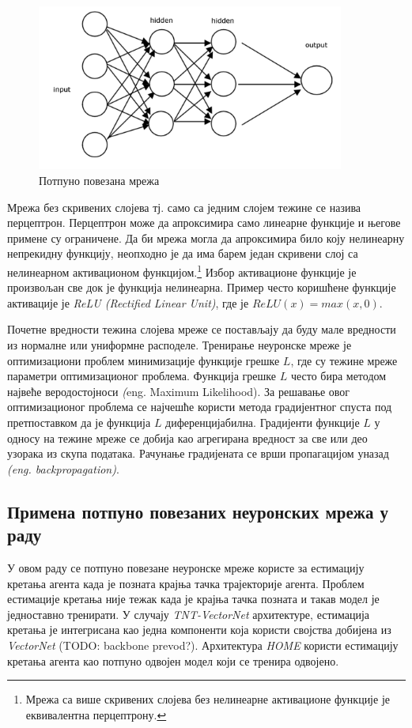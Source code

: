 \documentclass[11pt,oneside]{memoir}
\begin{document}
\begin{figure}[H]
  \centering
  \includegraphics[width=0.9\textwidth]{images/ffn.png}
  \caption{Потпуно повезана мрежа \label{ffn}}
\end{figure}

Мрежа без скривених слојева тј. само са једним слојем тежине се назива перцептрон. Перцептрон може да апроксимира само линеарне функције и 
његове примене су ограничене. Да би мрежа могла да апроксимира било коју нелинеарну непрекидну функцију, неопходно је да има барем
један скривени слој са нелинеарном активационом функцијом.\footnote{Мрежа са више скривених слојева без нелинеарне активационе функције
је еквивалентна перцептрону.} Избор активационе функције је произвољан све док је функција нелинеарна. Пример често коришћене
функције активације је \textit{ReLU (Rectified Linear Unit)}, где је $ReLU(x) = max(x, 0)$. 

Почетне вредности тежина слојева мреже се постављају да буду мале вредности из нормалне или униформне расподеле. Тренирање неуронске мреже
је оптимизациони проблем минимизације функције грешке $L$, где су тежине мреже параметри оптимизационог проблема. Функција грешке $L$ често
бира методом највеће веродостојноси \textit({eng. Maximum Likelihood}). За решавање овог оптимизационог проблема се најчешће користи 
метода градијентног спуста под претпоставком да је функција $L$ диференцијабилна. Градијенти функције $L$ у односу на тежине мреже 
се добија као агрегирана вредност за све или део узорака из скупа података. Рачунање градијената се врши пропагацијом уназад \textit{(eng. backpropagation)}.

\subsection{Примена потпуно повезаних неуронских мрежа у раду}

У овом раду се потпуно повезане неуронске мреже користе за естимацију кретања агента када је позната крајња тачка трајекторије агента. Проблем
естимације кретања није тежак када је крајња тачка позната и такав модел је једноставно тренирати. У случају \textit{TNT-VectorNet} архитектуре,
естимација кретања је интегрисана као једна компоненти која користи својства добијена из \textit{VectorNet} (TODO: backbone prevod?). Архитектура 
\textit{HOME} користи естимацију кретања агента као потпуно одвојен модел који се тренира одвојено. 
\end{document}
